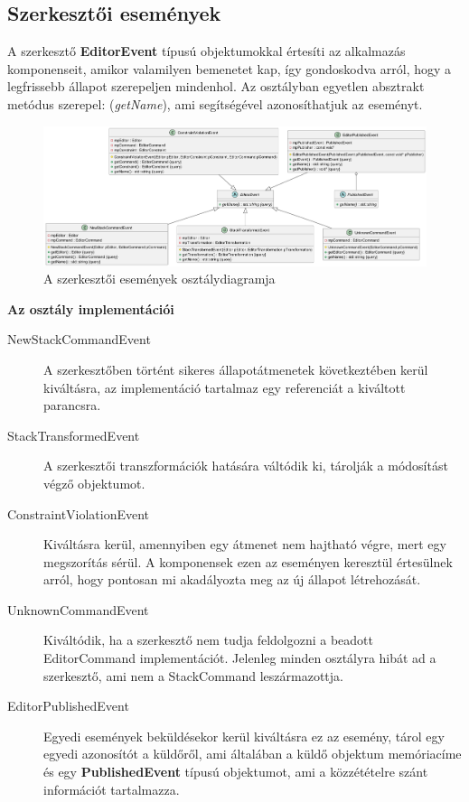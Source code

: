 \subsection{Szerkesztői események}

A szerkesztő \textbf{EditorEvent} típusú objektumokkal értesíti az alkalmazás komponenseit, amikor valamilyen bemenetet kap, így gondoskodva arról, hogy a legfrissebb állapot szerepeljen mindenhol. Az osztályban egyetlen absztrakt metódus szerepel: (\textit{getName}), ami segítségével azonosíthatjuk az eseményt.

\begin{figure}[H]
	\centering
	\includegraphics[width=1\linewidth]{images/class_editor_event.png}
	\caption{A szerkesztői események osztálydiagramja}
	\label{fig:class_editor_event-1}
\end{figure}

\textbf{Az osztály implementációi}

\begin{description}
	\item[NewStackCommandEvent] A szerkesztőben történt sikeres állapotátmenetek következtében kerül kiváltásra, az implementáció tartalmaz egy referenciát a kiváltott parancsra.
	\item[StackTransformedEvent] A szerkesztői transzformációk hatására váltódik ki, tárolják a módosítást végző objektumot.
	\item[ConstraintViolationEvent] Kiváltásra kerül, amennyiben egy átmenet nem hajtható végre, mert egy megszorítás sérül. A komponensek ezen az eseményen keresztül értesülnek arról, hogy pontosan mi akadályozta meg az új állapot létrehozását.
	\item[UnknownCommandEvent] Kiváltódik, ha a szerkesztő nem tudja feldolgozni a beadott EditorCommand implementációt. Jelenleg minden osztályra hibát ad a szerkesztő, ami nem a StackCommand leszármazottja.
	\item[EditorPublishedEvent] Egyedi események beküldésekor kerül kiváltásra ez az esemény, tárol egy egyedi azonosítót a küldőről, ami általában a küldő objektum memóriacíme és egy \textbf{PublishedEvent} típusú objektumot, ami a közzétételre szánt információt tartalmazza.
\end{description}

